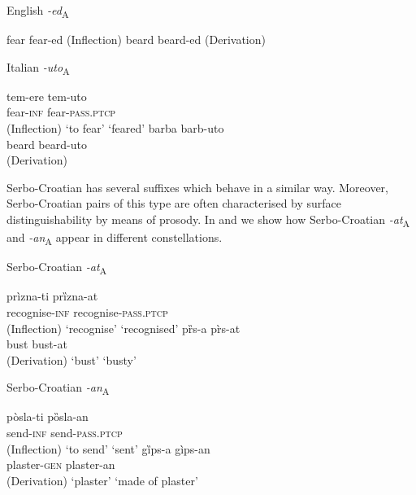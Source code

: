 \documentclass[output=paper]{langsci/langscibook}
\begin{document}
\begin{exe} \label{ex:simonovic:1}
	\ex English \textit{-ed}\textsubscript{A}
	\begin{xlist} 
		\ex fear fear-ed \hfill{(Inflection)}
		\ex beard beard-ed \hfill{(Derivation)}
	\end{xlist}
\end{exe}
\begin{exe}\label{ex:simonovic:2}
	\ex Italian \textit{-uto}\textsubscript{A} 
	\begin{xlist} 
	    \ex \gll tem-ere tem-uto \\	
        fear-\textsc{inf} fear-\textsc{pass.ptcp} \\ \hfill{(Inflection)}
		\glt `to fear' `feared'
		\ex \gll barba \hspace{0.15cm} barb-uto \\
        beard {} beard-uto\\\hfill{(Derivation)}	\end{xlist}
	\end{exe}


\noindent Serbo-Croatian has several suffixes which behave in a similar way. Moreover, Serbo-Croatian pairs of this type are often characterised by surface distinguishability by means of prosody. In  and  we show how Serbo-Croatian \textit{-at}\textsubscript{A} and \textit{-an}\textsubscript{A} appear in different constellations.  

\ea Serbo-Croatian \textit{-at}\textsubscript{A} \label{ex:simonovic:3} \begin{xlist} \ex \gll prìzna-ti prȉzna-at
\\	
recognise-\textsc{inf} recognise-\textsc{pass.ptcp} \\ \hfill{(Inflection)}
		\glt `recognise' \hspace{0.4cm} `recognised'
		\ex \gll pȑs-a { } pr̀s-at \\
bust {} bust-at\\ \hfill{(Derivation)}
		\glt `bust'  \hspace{0.06cm} `busty'
	\end{xlist}
\z
	
	
\ea Serbo-Croatian \textit{-an}\textsubscript{A}\label{ex:simonovic:4} 
\begin{xlist} 
\ex \gll pòsla-ti pȍsla-an\\	
send-\textsc{inf} send-\textsc{pass.ptcp}\\ \hfill{(Inflection)}
		\glt `to send'  `sent'
		\ex \gll gȉps-a gìps-an \\
plaster-\textsc{gen} plaster-an\\ \hfill{(Derivation)}
 		\glt `plaster' \hspace{0.45cm} `made of plaster'

	\end{xlist}
\z
	
\end{document}
